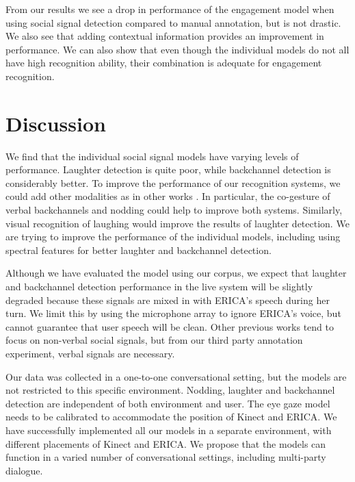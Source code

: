 \documentclass[letterpaper]{article} %
\begin{document}
\vspace{-1.02mm}
\vspace{-1.93mm}
From our results we see a drop in performance of the engagement model when using social signal detection compared to manual annotation, but is not drastic. We also see that adding contextual information provides an improvement in performance. We can also show that even though the individual models do not all have high recognition ability, their combination is adequate for engagement recognition.

\vspace{-0.86mm}
\vspace{-1.46mm}
\section{Discussion}
We find that the individual social signal models have varying levels of performance. Laughter detection is quite poor, while backchannel detection is considerably better. To improve the performance of our recognition systems, we could add other modalities as in other works \cite{Morency2005}. In particular, the co-gesture of verbal backchannels and nodding could help to improve both systems. Similarly, visual recognition of laughing would improve the results of laughter detection. We are trying to improve the performance of the individual models, including using spectral features for better laughter and backchannel detection.

Although we have evaluated the model using our corpus, we expect that laughter and backchannel detection performance in the live system will be slightly degraded because these signals are mixed in with ERICA's speech during her turn. We limit this by using the microphone array to ignore ERICA's voice, but cannot guarantee that user speech will be clean. Other previous works tend to focus on non-verbal social signals, but from our third party annotation experiment, verbal signals are necessary.

Our data was collected in a one-to-one conversational setting, but the models are not restricted to this specific environment. Nodding, laughter and backchannel detection are independent of both environment and user. The eye gaze model needs to be calibrated to accommodate the position of Kinect and ERICA. We have successfully implemented all our models in a separate environment, with different placements of Kinect and ERICA. We propose that the models can function in a varied number of conversational settings, including multi-party dialogue.
\end{document}
